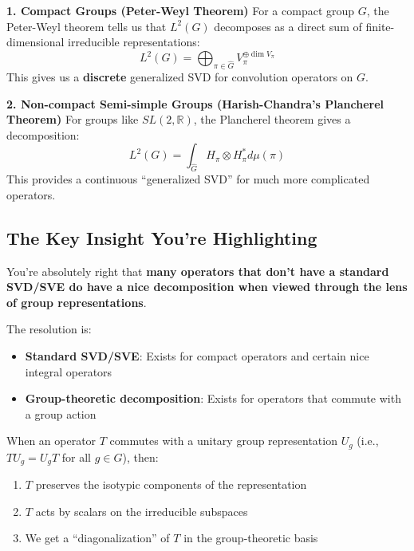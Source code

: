 \documentclass[aps,prl,reprint]{revtex4-2}
\begin{document}
\textbf{1. Compact Groups (Peter-Weyl Theorem)} For a compact group $G$, the
Peter-Weyl theorem tells us that $L^2(G)$ decomposes as a direct sum of
finite-dimensional irreducible representations: 
\begin{equation*}
L^2(G) = \bigoplus_{\pi \in \hat{G}} V_\pi^{\oplus \dim V_\pi} 
\end{equation*}
This gives us a \textbf{discrete} generalized SVD for convolution operators
on $G$.

\textbf{2. Non-compact Semi-simple Groups (Harish-Chandra's Plancherel
Theorem)} For groups like $SL(2,\mathbb{R})$, the Plancherel theorem gives a
decomposition: 
\begin{equation*}
L^2(G) = \int_{\hat{G}} H_\pi \otimes H_\pi^* d\mu(\pi) 
\end{equation*}
This provides a continuous ``generalized SVD'' for much more complicated
operators.

\subsection*{The Key Insight You're Highlighting}

You're absolutely right that \textbf{many operators that don't have a
standard SVD/SVE do have a nice decomposition when viewed through the lens
of group representations}.

The resolution is:

\begin{itemize}
\item \textbf{Standard SVD/SVE}: Exists for compact operators and certain
nice integral operators

\item \textbf{Group-theoretic decomposition}: Exists for operators that
commute with a group action
\end{itemize}

When an operator $T$ commutes with a unitary group representation $U_g$
(i.e., $TU_g = U_g T$ for all $g \in G$), then:

\begin{enumerate}
\item $T$ preserves the isotypic components of the representation

\item $T$ acts by scalars on the irreducible subspaces

\item We get a ``diagonalization'' of $T$ in the group-theoretic basis
\end{enumerate}
\end{document}

